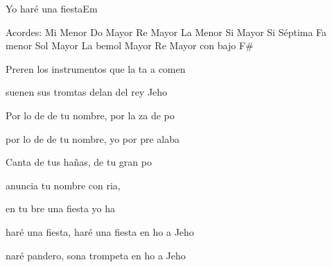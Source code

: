 \documentclass[12pt, spanish]{book}
\begin{document}
\begin{song}{Yo haré una fiesta}{Em}
        \ifChordBk
        \begin{SBOpGroup}
            Acordes:
            \upchord{\Em}\qquad Mi Menor \hfill
            \upchord{\C}\qquad Do Mayor \hfill\null\break
            \upchord{\D}\qquad Re Mayor \hfill
            \upchord{\Am}\qquad La Menor \hfill\null\break
            \upchord{\B}\qquad Si Mayor \hfill
            \upchord{\Bseven}\qquad Si S\'eptima \hfill\null\break
            \upchord{\Fm}\quad Fa menor \hfill
            \upchord{\G}\qquad Sol Mayor \hfill\null\break
            \upchord{\Aflat}\qquad La bemol Mayor \hfill
            \upchord{\DFs}\qquad Re Mayor con bajo F\# \hfill\null\break
        \end{SBOpGroup}
        \fi
        \begin{SBExtraKeys}{

            \begin{SBOpGroup}
                Preren los instrumentos que la ta  a comen

                suenen sus tromtas delan del rey Jeho
            \end{SBOpGroup}
            \vskip 20pt
            \begin{SBOpGroup}
                Por lo de de tu nombre, por la za de  po 

                por lo de de tu nombre, yo por pre  alaba

                Canta de tus hañas, de tu gran po   

                anuncia tu nombre con ria,

                en tu bre una fiesta yo ha   
            \end{SBOpGroup}

            \begin{SBChorus}
                 haré una fiesta,  haré una fiesta en ho a Jeho   

                naré pandero, sona trompeta en ho a Jeho   


\end{SBChorus}}
\end{SBExtraKeys}
\end{song}
\end{document}
